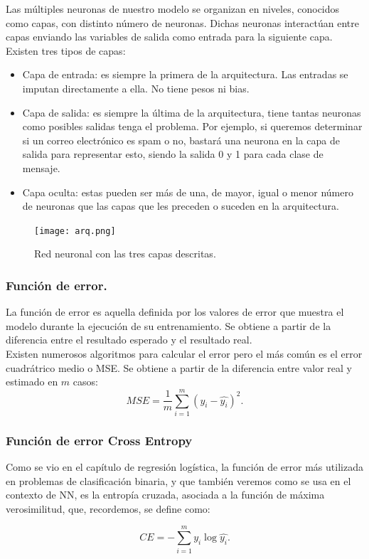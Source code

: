 \documentclass[a4paper,11pt]{article}
\begin{document}
\noindent
Las múltiples neuronas de nuestro modelo se organizan en niveles, conocidos como capas, con distinto número de neuronas. Dichas neuronas interactúan entre capas enviando las variables de salida como entrada para la siguiente capa.
Existen tres tipos de capas:
\begin{itemize}
    \item Capa de entrada: es siempre la primera de la arquitectura. Las entradas se imputan directamente a ella. No tiene pesos ni bias.
    \item Capa de salida: es siempre la última de la arquitectura, tiene tantas neuronas como posibles salidas tenga el problema. Por ejemplo, si queremos determinar si un correo electrónico es spam o no, bastará una neurona en la capa de salida para representar esto, siendo la salida 0 y 1 para cada clase de mensaje. 
    \item Capa oculta: estas pueden ser más de una, de mayor, igual o menor número de neuronas que las capas que les preceden o suceden en la arquitectura.
\end{itemize} 
\begin{figure}[H]
\centering
\texttt{[image: arq.png]}
\caption{Red neuronal con las tres capas descritas.}
\end{figure}
\subsubsection{Función de error.}
La función de error es aquella definida por los valores de error que muestra el modelo durante la ejecución de su entrenamiento. Se obtiene a partir de la diferencia entre el resultado esperado y el resultado real.\\

\noindent
Existen numerosos algoritmos para calcular el error pero el más común es el error cuadrátrico medio o MSE. Se obtiene a partir de la diferencia entre valor real y estimado en $m$ casos:
\[
MSE=\frac{1}{m}\sum_{i=1}^m (y_i - \hat{y_i})^2.
\]
\subsubsection{Función de error Cross Entropy}
Como se vio en el capítulo de regresión logística, la función de error más
utilizada en problemas de clasificación binaria, y que también veremos como se
usa en el contexto de NN, es la entropía cruzada, asociada a la función de máxima
verosimilitud, que, recordemos, se define como:

\[
CE=-\sum_{i=1}^m y_i \log\hat{y_i}.
\]
\end{document}
